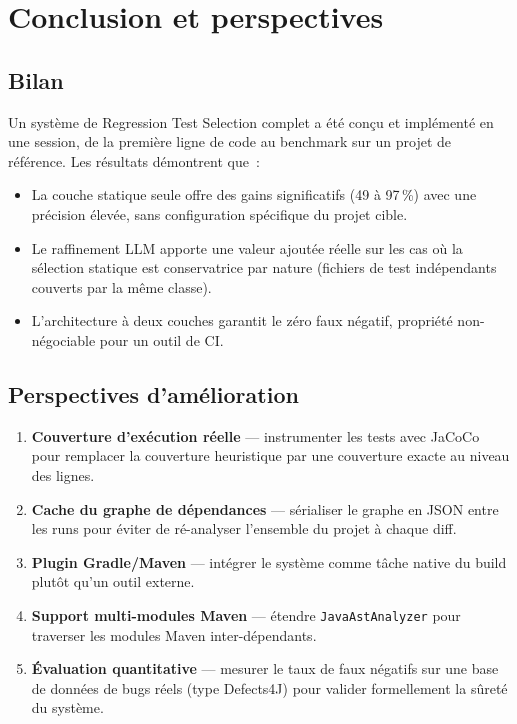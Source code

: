 \documentclass[12pt,a4paper]{article}
\begin{document}
\section{Conclusion et perspectives}

\subsection{Bilan}

Un système de Regression Test Selection complet a été conçu et implémenté en
une session, de la première ligne de code au benchmark sur un projet de
référence. Les résultats démontrent que~:

\begin{itemize}[noitemsep]
  \item La couche statique seule offre des gains significatifs (49 à 97\,\%)
        avec une précision élevée, sans configuration spécifique du projet cible.
  \item Le raffinement LLM apporte une valeur ajoutée réelle sur les cas où
        la sélection statique est conservatrice par nature (fichiers de test
        indépendants couverts par la même classe).
  \item L'architecture à deux couches garantit le zéro faux négatif, propriété
        non-négociable pour un outil de CI.
\end{itemize}

\subsection{Perspectives d'amélioration}

\begin{enumerate}[leftmargin=*, noitemsep, label=\textbf{\arabic{enumi}.}]
  \item \textbf{Couverture d'exécution réelle} — instrumenter les tests avec
        JaCoCo pour remplacer la couverture heuristique par une couverture
        exacte au niveau des lignes.
  \item \textbf{Cache du graphe de dépendances} — sérialiser le graphe en JSON
        entre les runs pour éviter de ré-analyser l'ensemble du projet à chaque
        diff.
  \item \textbf{Plugin Gradle/Maven} — intégrer le système comme tâche native
        du build plutôt qu'un outil externe.
  \item \textbf{Support multi-modules Maven} — étendre \texttt{JavaAstAnalyzer}
        pour traverser les modules Maven inter-dépendants.
  \item \textbf{Évaluation quantitative} — mesurer le taux de faux négatifs sur
        une base de données de bugs réels (type Defects4J) pour valider
        formellement la sûreté du système.
\end{enumerate}
\end{document}
